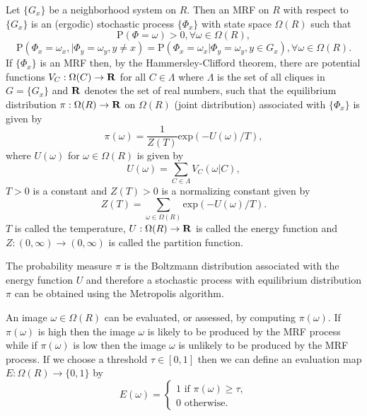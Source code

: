 \documentclass[12pt,twoside]{article}
\begin{document}
Let $\{G_x\}$ be a neighborhood system on $R$. Then an MRF on $R$ with respect to $\{G_x\}$
is an (ergodic) stochastic process $\{\Phi_x\}$ with state space $\Omega(R)$ such that
\begin{equation}
\mbox{P}(\Phi = \omega) > 0, \forall\omega\in\Omega(R),
\end{equation}
\begin{equation}
\mbox{P}(\Phi_x = \omega_x, | \Phi_y=\omega_y, y \neq x) = \mbox{P}(\Phi_x = \omega_x |\Phi_y=\omega_y,y\in G_x),\forall\omega\in\Omega(R).
\end{equation}
If $\{\Phi_x\}$ is an MRF then, by the Hammersley-Clifford theorem, there are potential functions
$V_C: \Omega(C) \rightarrow {\bf R}$ for all $C \in \Lambda$ where $\Lambda$ is the set of all cliques in $G = \{G_x\}$ and ${\bf R}$ denotes the set of real numbers, such that the equilibrium
distribution $\pi:\Omega(R)\rightarrow{\bf R}$ on $\Omega(R)$ (joint distribution) associated with $\{\Phi_x\}$ is given by
\begin{equation}
\pi(\omega) = \frac{1}{Z(T)}\mbox{exp}(-U(\omega)/T),
\end{equation}
where $U(\omega)$ for $\omega\in\Omega(R)$ is given by
\begin{equation}
U(\omega) = \sum_{C\in\Lambda}V_C(\omega|C),
\end{equation}
$T > 0$ is a constant and $Z(T) > 0$ is a normalizing constant given by
\begin{equation}
Z(T) = \sum_{\omega\in\Omega(R)}\mbox{exp}(-U(\omega)/T).
\end{equation}
$T$ is called the temperature, $U : \Omega(R) \rightarrow {\bf R}$ is called the energy function and $Z : (0,\infty) \rightarrow (0,\infty)$ is called the partition function.

The probability measure $\pi$ is the Boltzmann distribution associated
with the energy function $U$ and therefore a stochastic process with equilibrium distribution
$\pi$ can be obtained using the Metropolis algorithm.

An image $\omega\in\Omega(R)$ can be evaluated, or assessed, by computing $\pi(\omega)$. If $\pi(\omega)$ is high then the
image $\omega$ is likely to be produced by the MRF process while if $\pi(\omega)$ is low then the image $\omega$ is
unlikely to be produced by the MRF process. If we choose a threshold $\tau\in [0,1]$ then we can
define an evaluation map $E : \Omega(R)\rightarrow\{0,1\}$ by
\begin{equation}
E(\omega) = \left\{\begin{array}{l}
1 \mbox{ if }\pi(\omega) \geq\tau, \\
0 \mbox{ otherwise}.
\end{array}\right.
\end{equation}
\end{document}
